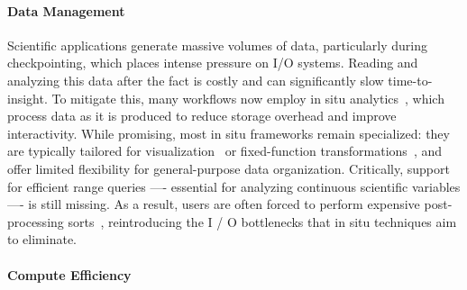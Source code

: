 \paragraph{Data Management}
Scientific applications generate massive volumes of data, particularly during checkpointing, which
places intense pressure on I/O systems.
Reading and analyzing this data after the fact is costly and can significantly slow
time-to-insight.
To mitigate this, many workflows now employ in situ
analytics~\cite{Bauer2016:SituMethodsInfrastructures,Child2020:TerminologySituVisualization}, which
process data as it is produced to reduce storage overhead and improve interactivity.
While promising, most in situ frameworks remain specialized: they are typically tailored for
visualization~\cite{Larse2022:Ascent,Ayach2015:Catalyst,Ibrah2019:InteractiveSituVisualization,Gross2021:LightweightInterfaceSitu,Larse2017:ALPINE}
or fixed-function transformations~\cite{Eisen2024:ADIOS}, and offer limited flexibility for
general-purpose data organization.
Critically, support for efficient range queries ---- essential for analyzing continuous scientific
variables ---- is still missing.
As a result, users are often forced to perform expensive post-processing
sorts~\cite{Dong2016,Sunda2013:HykSort,Rasmu2011:TritonSort}, reintroducing the I / O bottlenecks that in situ techniques aim to eliminate.

\paragraph{Compute Efficiency}


